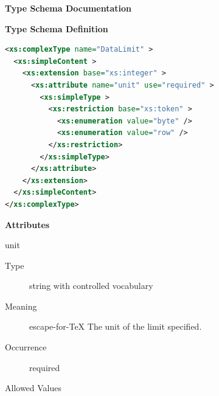 \documentclass{ivoa}
\begin{document}
\begingroup
      	\renewcommand*\descriptionlabel[1]{%
      	\hbox to 5.5em{\emph{#1}\hfil}}\vspace{2ex}\noindent\textbf{ Type Schema Documentation}


\vspace{1ex}\noindent\textbf{ Type Schema Definition}

\begin{lstlisting}[language=XML,basicstyle=\footnotesize]
<xs:complexType name="DataLimit" >
  <xs:simpleContent >
    <xs:extension base="xs:integer" >
      <xs:attribute name="unit" use="required" >
        <xs:simpleType >
          <xs:restriction base="xs:token" >
            <xs:enumeration value="byte" />
            <xs:enumeration value="row" />
          </xs:restriction>
        </xs:simpleType>
      </xs:attribute>
    </xs:extension>
  </xs:simpleContent>
</xs:complexType>
\end{lstlisting}

\vspace{0.5ex}\noindent\textbf{ Attributes}

\begingroup\small\begin{bigdescription}
\item[unit]
\begin{description}
\item[Type] string with controlled vocabulary
\item[Meaning] escape-for-TeX{{{
            The unit of the limit specified.
            }}}
\item[Occurrence] required

\item[Allowed Values]\hfil
{}
\end{description}


\end{bigdescription}\endgroup

\endgroup
\end{document}
